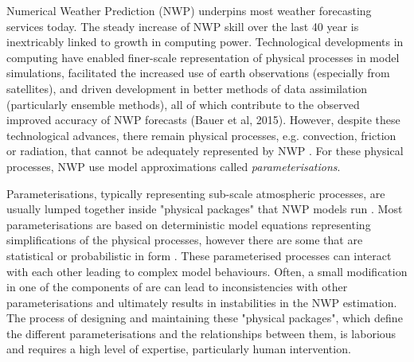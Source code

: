 \documentclass[twocol]{ametsoc}
\begin{document}
Numerical Weather Prediction (NWP) underpins most weather forecasting services today. The steady increase of NWP skill over the last 40 year is inextricably linked to growth in computing power. Technological developments in computing have enabled finer-scale representation of physical processes in model simulations, facilitated the increased use of earth observations (especially from satellites), and driven development in better methods of data assimilation (particularly ensemble methods), all of which contribute to the observed improved accuracy of NWP forecasts (Bauer et al, 2015). However, despite these technological advances, there remain physical processes, e.g. convection, friction or radiation, that cannot be adequately represented by NWP \citep{stensrud2009parameterization}. For these physical processes, NWP use model approximations called \emph{parameterisations}.

Parameterisations, typically representing sub-scale atmospheric processes, are usually lumped together inside "physical packages" that NWP models run \citep{LTG-81}. Most parameterisations are based on deterministic model equations representing simplifications of the physical processes, however there are some that are statistical or probabilistic in form \citep{berner2017stochastic}. These parameterised processes can interact with each other leading to complex model behaviours.  Often, a small modification in one of the components of are can lead to inconsistencies with other parameterisations and ultimately results in instabilities in the NWP estimation. The process of designing and maintaining these "physical packages", which define the different parameterisations and the relationships between them, is laborious and requires a high level of expertise, particularly human intervention.
\end{document}
